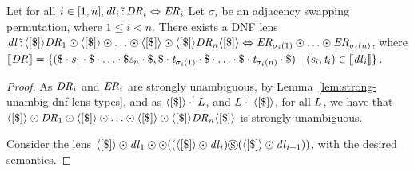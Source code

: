 \documentclass[numbers,10pt,preprint\ifanon ,nocopyrightspace\fi]{sigplanconf}
\begin{document}
\begin{lemma}
  Let for all $i \in [1,n], \mathit{dl}_i \,\tilde{:}\,
  \mathit{DR}_i \Leftrightarrow \mathit{ER}_i$
  Let $\sigma_i$ be an adjacency swapping permutation, where $1 \leq i < n$.
  There exists a DNF lens $\mathit{dl} \,\tilde{:}\, \langle[\$]\rangle
  \mathit{DR}_1 \odot \langle[\$]\rangle \odot
  \ldots \odot \langle[\$]\rangle \odot
  \langle[\$]\rangle \mathit{DR}_n \langle[\$]\rangle \Leftrightarrow
  \mathit{ER}_{\sigma_i(1)} \odot \ldots \odot
  \mathit{ER}_{\sigma_i(n)}$, where $[ \! [\mathit{DR}] \! ] =
  \{(\$\cdot\mathit{s}_1\cdot\$\cdot\ldots\cdot\$\mathit{s}_n\cdot\$,
    \$\cdot\mathit{t}_{\sigma_i(1)}\cdot\$\cdot\ldots\cdot\$\cdot\mathit{t}_{\sigma_i(n)}\cdot\$)
    ~|~
  (\mathit{s}_i,\mathit{t}_i) \in [ \! [\mathit{dl}_i] \! ]\}$.
\end{lemma}
\begin{proof}
  As $\mathit{DR}_i$ and
  $\mathit{ER}_i$ are strongly unambiguous, by
  Lemma~\ref{lem:strong-unambig-dnf-lens-types}, and as
  $\langle[\$]\rangle \cdot^! L$, and
  $L \cdot^! \langle[\$]\rangle$, for all $L$,
  we have that $\langle[\$]\rangle \odot \mathit{DR}_1 \odot \langle[\$]\rangle \odot
  \ldots \odot \langle[\$]\rangle \odot
  \langle[\$]\rangle \mathit{DR}_n \langle[\$]\rangle$ is strongly
  unambiguous.

  Consider the lens
  $\langle[\$]\rangle \odot \mathit{dl}_1 \odot
  \odot ((\langle[\$]\rangle \odot \mathit{dl}_i)
  \circledS (\langle[\$]\rangle \odot \mathit{dl}_{i+1}))$,
  with the desired semantics.
\end{proof}
\end{document}
